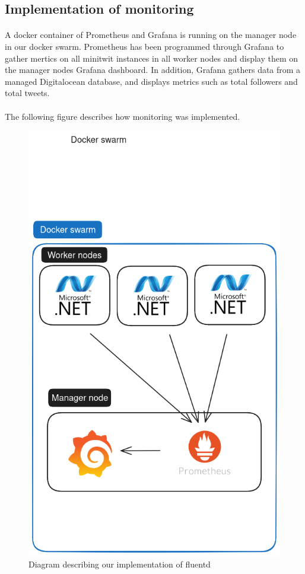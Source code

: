\subsection{Implementation of monitoring} 
\paragraph{} A docker container of Prometheus and Grafana is running on the manager node in our docker swarm. Prometheus has been programmed through Grafana to gather mertics on all minitwit instances in all worker nodes and display them on the manager nodes Grafana dashboard. In addition, Grafana gathers data from a managed Digitalocean database, and displays metrics such as total followers and total tweets.
\paragraph{} The following figure describes how monitoring was implemented.
\begin{figure}[h]
	\centering
	\includegraphics[width=1\textwidth]{Monitoring2.png}
	\caption{Diagram describing our implementation of fluentd}
	\label{fig:Monitoring2}
\end{figure}

